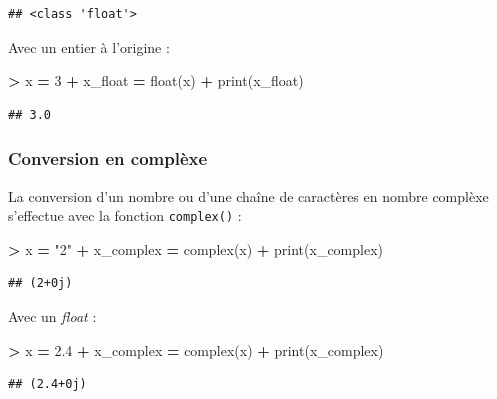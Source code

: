 \documentclass[12pt,]{book}
\newenvironment{Shaded}{\begin{snugshade}}{\end{snugshade}}
\newcommand{\DecValTok}[1]{\textcolor[rgb]{0.00,0.00,0.81}{#1}}
\newcommand{\FloatTok}[1]{\textcolor[rgb]{0.00,0.00,0.81}{#1}}
\newcommand{\StringTok}[1]{\textcolor[rgb]{0.31,0.60,0.02}{#1}}
\newcommand{\OperatorTok}[1]{\textcolor[rgb]{0.81,0.36,0.00}{\textbf{#1}}}
\newcommand{\BuiltInTok}[1]{#1}
\newcommand{\NormalTok}[1]{#1}
\numberwithin{equation}{section}
\numberwithin{countremarque}{section}
\begin{document}
\begin{lstlisting}
## <class 'float'>
\end{lstlisting}

Avec un entier à l'origine :

\begin{Shaded}
\begin{Highlighting}[]
\OperatorTok{>}\NormalTok{ x }\OperatorTok{=} \DecValTok{3}
\OperatorTok{+}\NormalTok{ x_float }\OperatorTok{=} \BuiltInTok{float}\NormalTok{(x)}
\OperatorTok{+} \BuiltInTok{print}\NormalTok{(x_float)}
\end{Highlighting}
\end{Shaded}

\begin{lstlisting}
## 3.0
\end{lstlisting}

\subsubsection{Conversion en complèxe}\label{conversion-en-complexe}

La conversion d'un nombre ou d'une chaîne de caractères en nombre
complèxe s'effectue avec la fonction \texttt{complex()} :

\begin{Shaded}
\begin{Highlighting}[]
\OperatorTok{>}\NormalTok{ x }\OperatorTok{=} \StringTok{"2"}
\OperatorTok{+}\NormalTok{ x_complex }\OperatorTok{=} \BuiltInTok{complex}\NormalTok{(x)}
\OperatorTok{+} \BuiltInTok{print}\NormalTok{(x_complex)}
\end{Highlighting}
\end{Shaded}

\begin{lstlisting}
## (2+0j)
\end{lstlisting}

Avec un \emph{float} :

\begin{Shaded}
\begin{Highlighting}[]
\OperatorTok{>}\NormalTok{ x }\OperatorTok{=} \FloatTok{2.4}
\OperatorTok{+}\NormalTok{ x_complex }\OperatorTok{=} \BuiltInTok{complex}\NormalTok{(x)}
\OperatorTok{+} \BuiltInTok{print}\NormalTok{(x_complex)}
\end{Highlighting}
\end{Shaded}

\begin{lstlisting}
## (2.4+0j)
\end{lstlisting}
\end{document}
